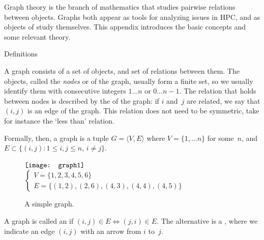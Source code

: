 
Graph theory is the branch of mathematics that studies pairwise
relations between objects. Graphs both appear as tools for analyzing
issues in \ac{HPC}, and as objects of study themselves. This
appendix introduces the basic concepts and some relevant theory.

 {Definitions}

A graph consists of a set of objects, and set of relations between them.
The objects, called the \emph{nodes}
or  of the graph, usually form a finite set, so we
usually identify them with consecutive integers $1\ldots n$ or $0\ldots
n-1$. The relation that holds between nodes is described by the
 of the graph: if $i$ and~$j$ are related, we say
that $( i,j)$ is an edge of the graph. This relation does not need to
be symmetric, take for instance the `less than' relation.

Formally, then, a graph is a tuple $G=\langle V,E\rangle$ where
$V=\{1,\ldots n\}$ for some~$n$, and $E\subset\{(i,j)\colon 1\leq
i,j\leq n,\,i\not=j\}$.

\begin{figure}[ht]
  \hbox{$\vcenter{\hbox{%
        \texttt{[image: graph1]}
    }}$%
    $
    \begin{cases}
      V=\{1,2,3,4,5,6\}\\
      E=\{ (1,2),(2,6),(4,3),(4,4),(4,5)\}
    \end{cases}
    $}
  \caption{A simple graph.}
  \label{fig:graph1}  
\end{figure}

A graph is called an  if $(i,j)\in
E\Leftrightarrow (j,i)\in E$. The alternative is a
, where we indicate an edge $(i,j)$ with
an arrow from $i$ to~$j$.

